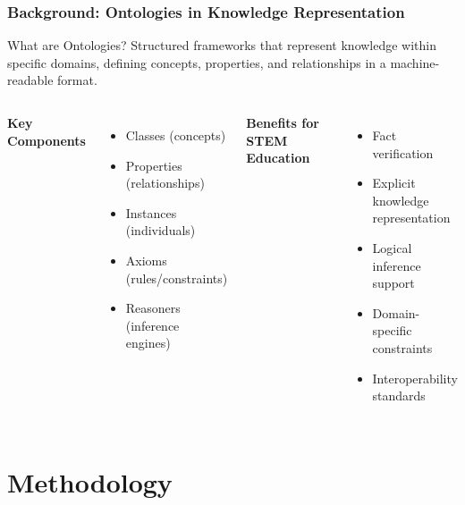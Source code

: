 \documentclass{beamer}
\begin{document}
\begin{frame}
\frametitle{Background: Ontologies in Knowledge Representation}

\begin{block}{What are Ontologies?}
Structured frameworks that represent knowledge within specific domains, defining concepts, properties, and relationships in a machine-readable format.
\end{block}

\begin{columns}

\textbf{Key Components}
\begin{itemize}
    \item Classes (concepts)
    \item Properties (relationships)
    \item Instances (individuals)
    \item Axioms (rules/constraints)
    \item Reasoners (inference engines)
\end{itemize}

\textbf{Benefits for STEM Education}
\begin{itemize}
    \item \alert{Fact verification}
    \item Explicit knowledge representation
    \item Logical inference support
    \item Domain-specific constraints
    \item Interoperability standards
\end{itemize}

\end{columns}
\end{frame}

\section{Methodology}
\end{document}
